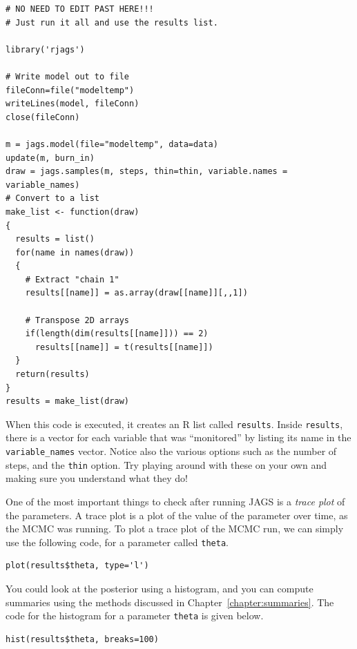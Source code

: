 \begin{framed}
\begin{verbatim}
# NO NEED TO EDIT PAST HERE!!!
# Just run it all and use the results list.

library('rjags')

# Write model out to file
fileConn=file("modeltemp")
writeLines(model, fileConn)
close(fileConn)

m = jags.model(file="modeltemp", data=data)
update(m, burn_in)
draw = jags.samples(m, steps, thin=thin, variable.names = variable_names)
# Convert to a list
make_list <- function(draw)
{
  results = list()
  for(name in names(draw))
  {
    # Extract "chain 1"
    results[[name]] = as.array(draw[[name]][,,1])
    
    # Transpose 2D arrays
    if(length(dim(results[[name]])) == 2)
      results[[name]] = t(results[[name]])
  }
  return(results)
}
results = make_list(draw)
\end{verbatim}
\end{framed}

When this code is executed, it creates an R list called {\tt results}.
Inside {\tt results}, there is a vector
for each variable that was ``monitored'' by listing its name in
the {\tt variable\_names} vector.
Notice also the various options such as the number of steps, and the {\tt thin}
option. Try playing around with these on your own and making sure you understand
what they do!

One of the most important things to check after running JAGS is a {\it trace
plot} of the parameters. A trace plot is a plot of the value of the parameter
over time, as the MCMC was running.
To plot a trace plot of the MCMC run, we can simply use the following code,
for a parameter called {\tt theta}.
\begin{framed}
\begin{verbatim}
plot(results$theta, type='l')
\end{verbatim}
\end{framed}

You could look at the posterior using a
histogram, and you can compute summaries using the methods discussed in
Chapter~\ref{chapter:summaries}. The code for the histogram for a parameter
{\tt theta} is given below.

\begin{framed}
\begin{verbatim}
hist(results$theta, breaks=100)
\end{verbatim}
\end{framed}

